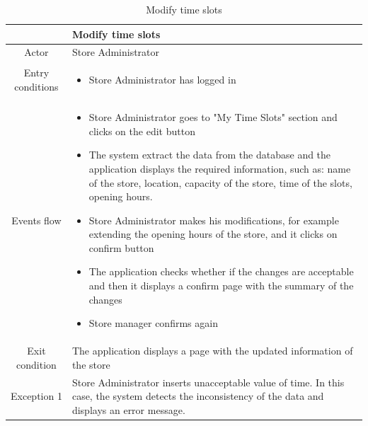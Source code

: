 \documentclass[table, 12pt]{article}
\begin{document}
\newpage
\begin{longtable}{|c| p{10cm}|}
    \caption{Modify time slots}                                                                                                                                              \\
    \hline
                     & Modify time slots                                                                                                                                     \\
    \hline
    Actor            & Store Administrator                                                                                                                                   \\
    \hline
    Entry conditions & \begin{itemize}
        \item Store Administrator has logged in
    \end{itemize}                                                                                                                            \\
    \hline
    Events flow      & \begin{itemize}[nosep,after=\strut]
        \item Store Administrator goes to "My Time Slots" section and clicks on the edit button
        \item The system extract the data from the database and the application displays the required information, such as: name of the store, location, capacity of the store, time of the slots, opening hours.
        \item Store Administrator makes his modifications, for example extending the opening hours of the store, and it clicks on confirm button
        \item The application checks whether if the changes are acceptable and then it displays a confirm page with the summary of the changes
        \item Store manager confirms again
    \end{itemize}                                                                                                                            \\
    \hline
    Exit condition   & The application displays a page with the updated information of the store
    \\
    \hline
    \hline
    Exception 1      & Store Administrator inserts unacceptable value of time. In this case, the system detects the inconsistency of the data and displays an error message. \\
    \hline
\end{longtable}
\end{document}
